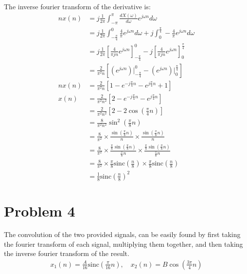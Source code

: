 \documentclass{article}
\begin{document}
The inverse fourier transform of the derivative is:
\begin{align*}
    nx(n) &= j \frac{1}{2\pi} \int_{-\pi}^{\pi} \frac{dX(\omega)}{d\omega} e^{j \omega n} d\omega \\
    &= j \frac{1}{2\pi}\int_{-\frac{\pi}{4}}^{0} \frac{4}{\pi} e^{j \omega n} d\omega + j \int_{0}^{\frac{\pi}{4}} -\frac{4}{\pi} e^{j \omega n} d\omega \\
    &= j \frac{1}{2\pi}\left[ \frac{4}{\pi jn} e^{j \omega n} \right]_{-\frac{\pi}{4}}^{0} - j \left[ \frac{4}{\pi jn} e^{j \omega n} \right]_{0}^{\frac{\pi}{4}} \\
    &= \frac{2}{\pi^2 n} \left[ \left(e^{j\omega n}\right)\Bigg|_{-\frac{\pi}{4}}^{0} - \left(e^{j\omega n}\right)\Bigg|_{0}^{\frac{\pi}{4}} \right] \\
    nx(n) &= \frac{2}{\pi^2 n} \left[ 1 - e^{-j\frac{\pi}{4} n} - e^{j\frac{\pi}{4} n} + 1 \right] \\
    x(n)&= \frac{2}{\pi^2 n^2} \left[ 2 - e^{-j\frac{\pi}{4} n} - e^{j\frac{\pi}{4} n} \right] \\
    &= \frac{2}{\pi^2 n^2} \left[2 - 2\cos\left(\frac{\pi}{4}n\right)\right] \\
    &= \frac{8}{\pi^2 n^2} \sin^2\left(\frac{\pi}{8}n\right) \\
    &= \frac{8}{\pi^2} \times \frac{\sin\left(\frac{\pi}{8}n\right)}{n} \times \frac{\sin\left(\frac{\pi}{8}n\right)}{n} \\
    &= \frac{8}{\pi^2}  \times \frac{\frac{\pi}{8} \sin\left(\frac{\pi}{8}n\right)}{\frac{\pi}{8}n} \times \frac{\frac{\pi}{8} \sin\left(\frac{\pi}{8}n\right)}{\frac{\pi}{8}n} \\
    &= \frac{8}{\pi^2}  \times \frac{\pi}{8} \text{sinc}\left(\frac{n}{8}\right) \times \frac{\pi}{8} \text{sinc}\left(\frac{n}{8}\right) \\
    &= \boxed{\frac{1}{8}\text{sinc}\left(\frac{n}{8}\right)^2}
\end{align*}


\section{Problem 4}

The convolution of the two provided signals, can be easily found by first taking the fourier transform of each signal, multiplying them together, and then taking the inverse fourier transform of the result.
\begin{align*}
    x_1(n) = \frac{A}{16} \text{sinc} \left(\frac{\pi}{16}n\right), \quad x_2(n) = B\cos\left(\frac{3\pi}{4}n\right)
\end{align*}
\end{document}
